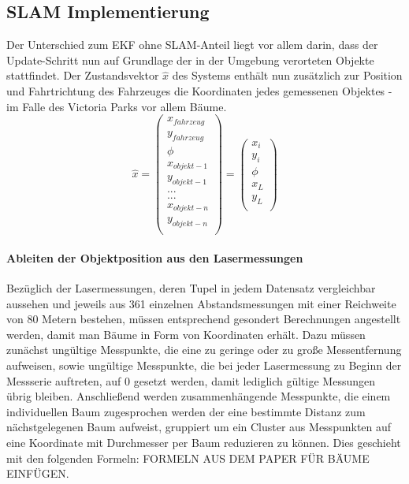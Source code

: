 \documentclass[11pt]{article}
\begin{document}
\subsection{SLAM Implementierung}
Der Unterschied zum EKF ohne SLAM-Anteil liegt vor allem darin, dass der Update-Schritt nun auf Grundlage der in der Umgebung verorteten Objekte stattfindet. Der Zustandsvektor $\hat{x}$ des Systems enthält nun zusätzlich zur Position und Fahrtrichtung des Fahrzeuges die Koordinaten jedes gemessenen Objektes - im Falle des Victoria Parks vor allem Bäume. 
\begin{equation}\label{SLAM-State-Vector}
	\hat{x} = \begin{pmatrix}
		x_{fahrzeug} \\
		y_{fahrzeug} \\
		\phi \\
		x_{objekt-1} \\
		y_{objekt-1} \\
		... \\
		... \\
		x_{objekt-n} \\
		y_{objekt-n} \\
	  \end{pmatrix} = \begin{pmatrix}
		  x_i \\
		  y_i \\
		  \phi \\
		  x_L \\
		  y_L \\
	  \end{pmatrix}
\end{equation}

\paragraph{Ableiten der Objektposition aus den Lasermessungen}
Bezüglich der Lasermessungen, deren Tupel in jedem Datensatz vergleichbar aussehen und jeweils aus 361 einzelnen Abstandsmessungen mit einer Reichweite von 80 Metern bestehen, müssen entsprechend gesondert Berechnungen angestellt werden, damit man Bäume in Form von Koordinaten erhält. Dazu müssen zunächst ungültige Messpunkte, die eine zu geringe oder zu große Messentfernung aufweisen, sowie ungültige Messpunkte, die bei jeder Lasermessung zu Beginn der Messserie auftreten, auf 0 gesetzt werden, damit lediglich gültige Messungen übrig bleiben. Anschließend werden zusammenhängende Messpunkte, die einem individuellen Baum zugesprochen werden der eine bestimmte Distanz zum nächstgelegenen Baum aufweist, gruppiert um ein Cluster aus Messpunkten auf eine Koordinate mit Durchmesser per Baum reduzieren zu können. Dies geschieht mit den folgenden Formeln: FORMELN AUS DEM PAPER FÜR BÄUME EINFÜGEN.
\end{document}
